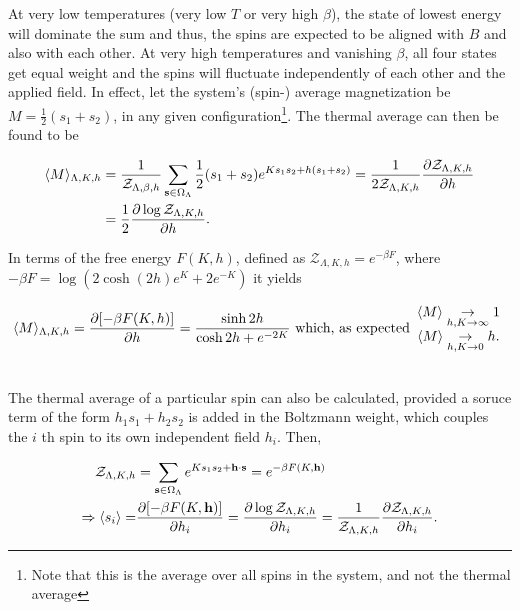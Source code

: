 \documentclass{homework}
\begin{document}
At very low temperatures (very low $T$ or very high $\beta$), the state of lowest energy will dominate the sum and thus, the spins are expected to be aligned with $B$ and also with each other. At very high temperatures and vanishing $\beta$, all four states get equal weight and the spins will fluctuate independently of each other and the applied field. In effect, let the system's (spin-) average magnetization be $M = \frac{1}{2} (s_1+s_2)$, in any given configuration\footnote{Note that this is the average over all spins in the system, and not the thermal average}. The thermal average can then be found to be 

\begin{equation}
    \begin{split}
        \langle M \rangle_{\Lambda, K, h} &= \frac{1}{ \mathcal{Z}_{\Lambda, \beta, h}} \sum_{{\bf s} \in \Omega_\Lambda} \frac{1}{2} (s_1+s_2) e^{K s_1 s_2 + h(s_1+s_2)} = \frac{1}{2 \mathcal{Z}_{\Lambda, K, h} }\frac{\partial  \mathcal{Z}_{\Lambda, K, h} }{\partial h} \\
        &= \frac{1}{2} \frac{\partial \log  \mathcal{Z}_{\Lambda, K, h}}{\partial h}.
    \end{split}
\end{equation}

In terms of the free energy $F(K,h)$, defined as $\mathcal{Z}_{\Lambda, K, h} = e^{-\beta F}$, where $-\beta F = \log(2 \cosh(2h) e^{K} + 2e^{-K})$ it yields

\begin{equation}
    \langle M \rangle_{\Lambda, K, h}  = \frac{\partial [-\beta F(K,h)]}{\partial h} = \frac{\sinh 2h}{\cosh 2h + e^{-2K}} \textnormal{ which, as expected} \begin{array}{c}
         \langle M \rangle \underset{h, K \rightarrow \infty}{\rightarrow} 1   \\
         \langle M \rangle \underset{h, K \rightarrow 0}{\rightarrow} h. 
    \end{array}
\end{equation}

\blanky \\

The thermal average of a particular spin can also be calculated, provided a soruce term of the form $h_1 s_1 + h_2 s_2$ is added in the Boltzmann weight, which couples the $i$
th spin to its own independent field $h_i$. Then,

\begin{align}
    \mathcal{Z}_{\Lambda, K, h} &= \sum_{{\bf s} \in \Omega_\Lambda} e^{K s_1 s_2 + {\bf h} \cdot {\bf s}} = e^{-\beta F(K, {\bf h})} \\ \Rightarrow \langle s_i \rangle = & \frac{\partial [-\beta F(K,{\bf h})]}{\partial h_i} = \frac{\partial \log \mathcal{Z}_{\Lambda, K, h}}{\partial h_i} = \frac{1}{\mathcal{Z}_{\Lambda, K, h}} \frac{\partial \mathcal{Z}_{\Lambda, K, h}}{\partial h_i} .
\end{align}
\end{document}
